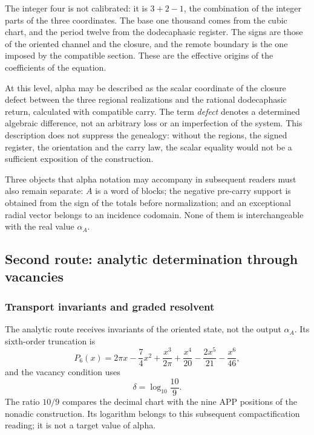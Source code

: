 The integer four is not calibrated: it is
\(3+2-1\), the combination of the integer parts of the three coordinates.
The base one thousand comes from the cubic chart, and the period twelve from the dodecaphasic register. The
signs are those of the oriented channel and the closure, and the remote boundary is
the one imposed by the compatible section. These are the effective origins of
the coefficients of the equation.

At this level, alpha may be described as the scalar coordinate of the
closure defect between the three regional realizations and the rational
dodecaphasic return, calculated with compatible carry. The term
\emph{defect} denotes a determined algebraic difference, not an
arbitrary loss or an imperfection of the system. This description does not
suppress the genealogy: without the regions, the signed register, the
orientation and the carry law, the scalar equality would not be a
sufficient exposition of the construction.

Three objects that alpha notation may accompany in subsequent readers
must also remain separate: \(A\) is a word of
blocks; the negative pre-carry support is obtained from the sign of the
totals before normalization; and an exceptional radial vector belongs to
an incidence codomain. None of them is interchangeable with the
real value \(\alpha_A\).






\subsection{Second route: analytic determination through vacancies}
\subsubsection{Transport invariants and graded resolvent}
\label{subsec:alpha-via-b}

The analytic route receives invariants of the oriented state, not the output
\(\alpha_A\). Its sixth-order truncation is
\begin{equation}
 P_6(x)=2\pi x-\frac74x^2
 +\frac{x^3}{2\pi}
 +\frac{x^4}{20}-\frac{2x^5}{21}-\frac{x^6}{46},
 \label{eq:alpha-p6}
\end{equation}
and the vacancy condition uses
\[
 \delta=\log_{10}\frac{10}{9}.
\]
The ratio \(10/9\) compares the decimal chart with the nine APP positions
of the nonadic construction. Its logarithm belongs to this subsequent
compactification reading; it is not a target value of alpha.

